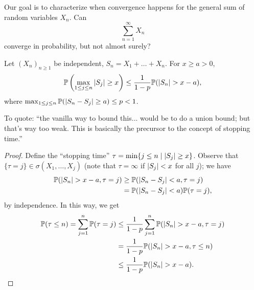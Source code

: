 Our goal is to characterize when convergence happens for the general sum of random variables $X_n$. Can
\[ \sum_{n=1}^\infty X_n \]
converge in probability, but not almost surely?
\begin{theorem} \label{thm:kolmogorov_maximal_inequality}
    Let $(X_n)_{n \geq 1}$ be independent, $S_n = X_1 + \dots + X_n$. For $x \geq a > 0$,
    \[ \mathbb P\left(\max_{1 \leq j \leq n} \left\lvert S_j \right\rvert \geq x\right) \leq \frac{1}{1-p} \mathbb P(\left\lvert S_n \right\rvert > x - a), \]
    where $\max_{1 \leq j \leq n} \mathbb P(\left\lvert S_n - S_j \right\rvert \geq a) \leq p < 1$.
\end{theorem}
{\color{amethyst} To quote: ``the vanilla way to bound this... would be to do a union bound; but that's way too weak. This is basically the precursor to the concept of stopping time.''}
\begin{proof}
    Define the ``stopping time'' $\tau = \min\{j \leq n \mid \left\lvert S_j \right\rvert \geq x\}$. Observe that $\{\tau = j\} \in \sigma(X_1, \dots, X_j)$ (note that $\tau = \infty$ if $\left\lvert S_j \right\rvert < x$ for all $j$); we have
    \begin{align*}
        \mathbb P(\left\lvert S_n \right\rvert > x - a, \tau = j) &\geq \mathbb P(\left\lvert S_n - S_j \right\rvert < a, \tau = j) \\
        &= \mathbb P(\left\lvert S_n - S_j \right\rvert < a) \mathbb P(\tau = j),
    \end{align*}
    by independence. In this way, we get
    \begin{align*}
        \mathbb P(\tau \leq n) = \sum_{j=1}^n \mathbb P(\tau = j) &\leq \frac{1}{1-p} \sum_{j=1}^n \mathbb P(\left\lvert S_n \right\rvert > x - a, \tau = j) \\
        &= \frac{1}{1 - p} \mathbb P(\left\lvert S_n \right\rvert > x - a, \tau \leq n) \\
        &\leq \frac{1}{1 - p} \mathbb P(\left\lvert S_n \right\rvert > x - a). \qedhere
    \end{align*}
\end{proof}

